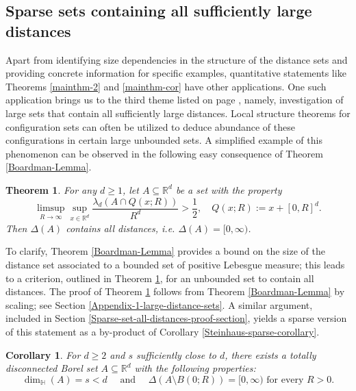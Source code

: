 \documentclass[a4paper,11pt]{amsart}
\newtheorem{theorem}{Theorem}
\newtheorem{cor}[thm]{\bf Corollary}
\numberwithin{equation}{section}
\begin{document}
\subsection{Sparse sets containing all sufficiently large distances} \label{all-suff-large-dis-intro-section} 
Apart from identifying size dependencies in the structure of the distance sets and providing concrete information for specific examples,  quantitative statements like Theorems \ref{mainthm-2} and \ref{mainthm-cor} have other applications. One such application brings us to the third theme listed on page \pageref{list-of-themes}, namely, investigation of large sets that contain all sufficiently large distances. Local structure theorems for configuration sets can often be utilized to deduce abundance of these configurations in certain large unbounded sets. A simplified example of this phenomenon can be observed in the following easy consequence of Theorem \ref{Boardman-Lemma}. 
\begin{theorem}{\cite{Boardman-1970}}\label{Boardman-Corollary}
For any $d \geq 1$, let $A \subseteq \mathbb R^d$ be a set with the property
\begin{equation}  \limsup_{R \rightarrow \infty} \sup_{x \in \mathbb R^d} \frac{\lambda_d(A \cap Q(x;R))}{R^d} > \frac{1}{2}, \quad Q(x;R) := x + [0, R]^d. \label{Boardman-condition} \end{equation} 
Then $\Delta(A)$ contains all distances, i.e. $\Delta(A) = [0, \infty)$.  
\end{theorem} 
\noindent To clarify, Theorem \ref{Boardman-Lemma} provides a bound on the size of the distance set associated to a bounded set of positive Lebesgue measure; this leads to a criterion, outlined in Theorem \ref{Boardman-Corollary}, for an unbounded set to contain all distances. The proof of Theorem \ref{Boardman-Corollary} follows from Theorem \ref{Boardman-Lemma} by scaling; see Section \ref{Appendix-1-large-distance-sets}. A similar argument, included in Section \ref{Sparse-set-all-distances-proof-section}, yields a sparse version of this statement as a by-product of Corollary \ref{Steinhaus-sparse-corollary}.
\begin{cor} \label{Sparse-all-distances-corollary}
For $d \geq 2$ and $s$ sufficiently close to $d$, there exists a totally disconnected Borel set $A \subseteq \mathbb R^d$ with the following properties:
\[ \dim_{\mathbb H}(A) = s < d \quad \text{ and } \quad \Delta(A \setminus B(0;R)) = [0, \infty) \text{ for every $R > 0$.} \] 
\end{cor}   
\vskip0.1in 
\end{document}
